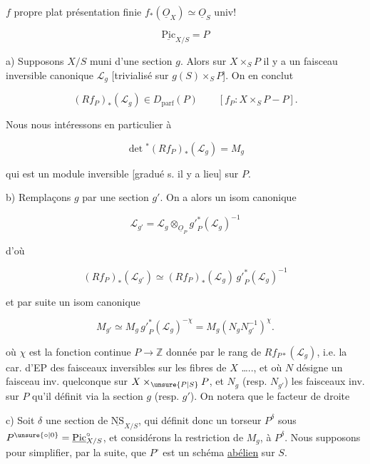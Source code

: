 

$f$ propre plat présentation finie \quad $f_*(\underline O_X)\simeq\underline O_S$ univ!


\[
\underline{\mathrm{Pic}}_{X/S}=P
\]

a) Supposons $X/S$ muni d'une section $g$. Alors sur $X\times_S P$ il y a un faisceau inversible canonique $\mathcal L_g$ [trivialisé sur $g(S)\times_S P$]. On en conclut

\[
(Rf_P)_*(\mathcal L_g)\in D_{\mathrm{parf}}(P)
\qquad [f_P:X\times_S P\mathbin{-}P].
\]

Nous nous intéressons en particulier à


\[
\det{}^{*}(Rf_P)_*(\mathcal L_g)=M_g
\]

qui est un module inversible [gradué s. il y a lieu] sur $P$.

b) Remplaçons $g$ par une section $g'$. On a alors un isom canonique

\[
\mathcal L_{g'}=\mathcal L_g\otimes_{\underline O_P}{g'}_P^{*}(\mathcal L_g)^{-1}
\]

d'où

\[
(Rf_P)_*(\mathcal L_{g'})\simeq(Rf_P)_*(\mathcal L_g)\,{g'}_P^{*}(\mathcal L_g)^{-1}
\]

et par suite un isom canonique

\[
M_{g'}\simeq M_g\,{g'}_P^{*}(\mathcal L_g)^{-\chi}=M_g\left(N_gN_{g'}^{-1}\right)^{\chi}.\tag*{(*)}
\]

où $\chi$ est la fonction continue $P\longrightarrow\mathbb Z$ donnée par le rang de $Rf_{P*}(\mathcal L_g)$, i.e. la car. d'EP des faisceaux inversibles sur les fibres de $X$ \ldots.., et où $N$ désigne un faisceau inv.  quelconque sur $X\times_{\unsure{P|S}}P$, et $N_g$ (resp. $N_{g'}$) les faisceaux inv. sur $P$ qu'il définit via la section $g$ (resp. $g'$). On notera que le facteur de droite


c) Soit $\delta$ une section de $\underline{\mathrm{NS}}_{X/S}$, qui définit donc un torseur $P^\delta$ sous $P^{\unsure{\circ|0}}=\underline{\mathrm{Pic}}^\circ_{X/S}$, et considérons la restriction de $M_g$,  à $P^\delta$. Nous supposons pour simplifier, par la suite, que $P^\circ$ est un schéma \uline{abélien} sur $S$.
